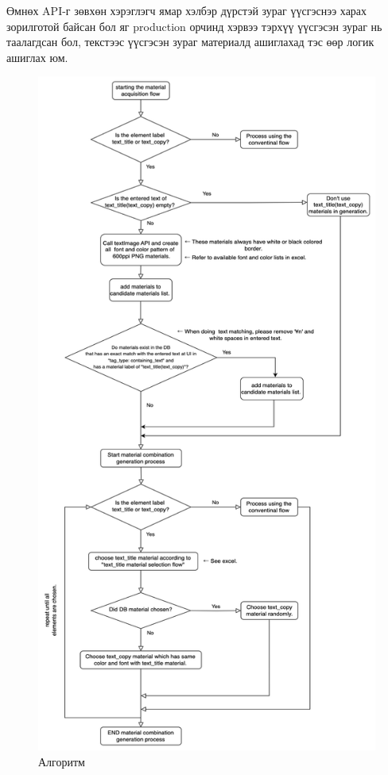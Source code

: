 Өмнөх API-г зөвхөн хэрэглэгч ямар хэлбэр дүрстэй зураг үүсгэснээ харах зорилготой байсан бол яг production орчинд хэрвээ тэрхүү үүсгэсэн зураг нь таалагдсан бол, текстээс үүсгэсэн зураг материалд ашиглахад тэс өөр логик ашиглах юм.

\begin{figure}
	\centering
	\includegraphics[scale=0.6]{src/pictures/algorithm1.png}
	\caption{Алгоритм}
\end{figure}

